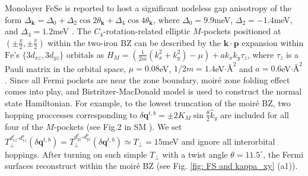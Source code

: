 Monolayer FeSe is reported to host a significant nodeless gap anisotropy of the form $\varDelta_{\bm{k}}=\varDelta_0+\varDelta_2\cos2\theta_{\bm{k}}+\varDelta_4\cos4\theta_{\bm{k}}$, where $\varDelta_0=9.9$meV, $\varDelta_2=-1.4$meV, and $\varDelta_4=1.2$meV \cite{zhang2016superconducting}. The $C_4$-rotation-related elliptic $M$-pockets positioned at $(\pm\frac{\pi}{2},\pm\frac{\pi}{2})$ within the two-iron BZ \cite{brouet2012impact,borisenko2016direct,yi2015observation} can be described by the $\bm{k}\cdot\bm{p}$ expansion within $\mathrm{Fe}$'s $\{3d_{xz},3d_{yz}\}$ orbitals \cite{agterberg2017resilient,ran2009nodal} as $H_M=\left(\frac{1}{2m}(k_x^2+k_y^2)-\mu\right)+a k_xk_y\tau_z$, where $\tau_z$ is a Pauli matrix in the orbital space, $\mu=0.08$eV, $1/2m=1.4$eV$\cdot\text{\AA}^2$ and $a=0.6$eV$\cdot\text{\AA}^2$. Since all Fermi pockets are near the zone boundary, moir\'e zone folding effect comes into play, and Bistritzer-MacDonald model \cite{bistritzer2011moire} is used to construct the normal state Hamiltonian. For example, to the lowest truncation of the moir\'e BZ, two hopping proccesses corresponding to $\delta\bm{q}^{t,b}=\pm 2K_M\sin\frac{\theta}{2}\hat{k}_y$ are included for all four of the $M$-pockets (see Fig.2 in SM \cite{SM}). We set $T_\perp^{d_{xz}^t\text{-}d_{xz}^b}(\delta\bm{q}^{t,b})=T_\perp^{d_{yz}^t\text{-}d_{yz}^b}(\delta\bm{q}^{t,b})\simeq T_\perp=15$meV and ignore all interorbital hoppings. After turning on such simple $T_\perp$ with a twist angle $\theta=11.5^\circ$, the Fermi surfaces reconstruct within the moir\'e BZ (see Fig. \ref{fig: FS and kappa_xy} (a1)). 

